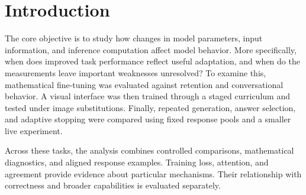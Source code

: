 \documentclass{article}
\title{\AUTHOR{title}}
\author{\AUTHOR{name, roll number}}
\begin{document}
\maketitle

\begin{abstract}
Model adaptation and additional computation can improve task performance, but these gains do not always establish the intended behavior. In this study, we examine mathematical fine-tuning, visual grounding, and test-time computation to understand how training restrictions, image information, and answer selection affect model outcomes. Mathematical fine-tuning improved GSM8K across all methods. However, retention varied across benchmarks, with L2-SP achieving nearly the same mathematical gain as Full FT while improving BoolQ. In the visual-language experiment, correct images improved answer scores, although counting remained weak and some annotation-derived labels were questionable. Test-time sampling increased the availability of correct answers faster than selected accuracy. Self-certainty weighting improved MATH selection without additional generation tokens, while adaptive stopping reduced token use with comparatively small accuracy changes. Together, these findings show why benchmark scores, diagnostic measurements, and response-level evidence need to be interpreted together when assessing model improvement. Code: \url{[LINK REQUIRED: public GitHub repository]}
\end{abstract}

\section{Introduction}
The core objective is to study how changes in model parameters, input information, and inference computation affect model behavior. More specifically, when does improved task performance reflect useful adaptation, and when do the measurements leave important weaknesses unresolved? To examine this, mathematical fine-tuning was evaluated against retention and conversational behavior. A visual interface was then trained through a staged curriculum and tested under image substitutions. Finally, repeated generation, answer selection, and adaptive stopping were compared using fixed response pools and a smaller live experiment.

Across these tasks, the analysis combines controlled comparisons, mathematical diagnostics, and aligned response examples. Training loss, attention, and agreement provide evidence about particular mechanisms. Their relationship with correctness and broader capabilities is evaluated separately.
\end{document}
